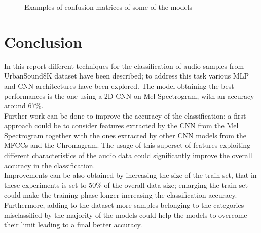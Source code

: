 \documentclass[oneside,openany]{article}
\begin{document}
\begin{figure}[!ht]
	     \quad
	    \caption{Examples of confusion matrices of some of the models}
	    \label{fig:mc}
	\end{figure}
	
	\newpage

    \section*{Conclusion}
    In this report different techniques for the classification of audio samples from UrbanSound8K dataset have been described; to address this task various MLP and CNN architectures have been explored. The model obtaining the best performances is the one using a 2D-CNN on Mel Spectrogram, with an accuracy around $67$\%.\\
    Further work can be done to improve the accuracy of the classification: a first approach could be to consider features extracted by the CNN from the Mel Spectrogram together with the ones extracted by other CNN models from the MFCCs and the Chromagram. The usage of this superset of features exploiting different characteristics of the audio data could significantly improve the overall accuracy in the classification.\\
    Improvements can be also obtained by increasing the size of the train set, that in these experiments is set to $50\%$ of the overall data size; enlarging the train set could make the training phase longer increasing the classification accuracy.\\
    Furthermore, adding to the dataset more samples belonging to the categories misclassified by the majority of the models could help the models to overcome their limit leading to a final better accuracy.
    
    \newpage
    
	
\end{document}
